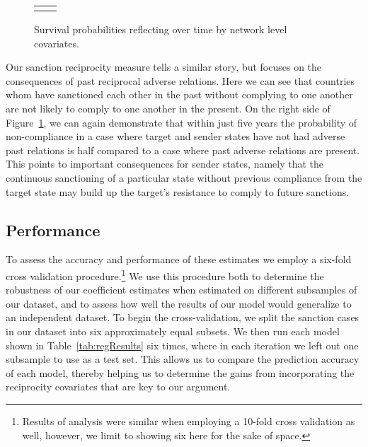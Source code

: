 \begin{figure}[ht]
	\centering
	\caption{Survival probabilities reflecting over time by network level covariates.}
	\begin{tabular}{cc}

	\subfloat[Subfigure 1][Compliance Reciprocity]{
		\resizebox{.45\textwidth}{!}{}
		\label{fig:compSancSurv}} & 
	
	\subfloat[Subfigure 2][Sanction Reciprocity]{
		\resizebox{.45\textwidth}{!}{}
		\label{fig:compSancSurv}}	

	\end{tabular}

	\label{fig:surv3}	
\end{figure}


Our sanction reciprocity measure tells a similar story, but focuses on the consequences of past reciprocal adverse relations. Here we can see that countries whom have sanctioned each other in the past without complying to one another are not likely to comply to one another in the present. On the right side of Figure~\ref{fig:surv3}, we can again demonstrate that within just five years the probability of non-compliance in a case where target and sender states have not had adverse past relations is half compared to a case where past adverse relations are present. This points to important consequences for sender states, namely that the continuous sanctioning of a particular state without previous compliance from the target state may build up the target's resistance to comply to future sanctions.

\subsection*{Performance}

To assess the accuracy and performance of these estimates we employ a six-fold cross validation procedure.\footnote{Results of analysis were similar when employing a 10-fold cross validation as well, however, we limit to showing six here for the sake of space.} We use this procedure both to determine the robustness of our coefficient estimates when estimated on different subsamples of our dataset, and to assess how well the results of our model would generalize to an independent dataset. To begin the cross-validation, we split the sanction cases in our dataset into six approximately equal subsets. We then run each model shown in Table~\ref{tab:regResults} six times, where in each iteration we left out one subsample to use as a test set. This allows us to compare the prediction accuracy of each model, thereby helping us to determine the gains from incorporating the reciprocity covariates that are key to our argument.

